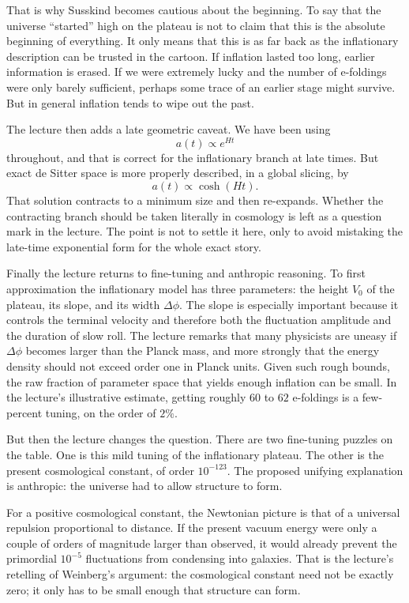 That is why Susskind becomes cautious about the beginning. To say that the universe ``started'' high on the plateau is not to claim that this is the absolute beginning of everything. It only means that this is as far back as the inflationary description can be trusted in the cartoon. If inflation lasted too long, earlier information is erased. If we were extremely lucky and the number of e-foldings were only barely sufficient, perhaps some trace of an earlier stage might survive. But in general inflation tends to wipe out the past.

The lecture then adds a late geometric caveat. We have been using
\begin{equation}
a(t)\propto e^{Ht}
\end{equation}
throughout, and that is correct for the inflationary branch at late times. But exact de Sitter space is more properly described, in a global slicing, by
\begin{equation}
a(t)\propto \cosh(Ht).
\end{equation}
That solution contracts to a minimum size and then re-expands. Whether the contracting branch should be taken literally in cosmology is left as a question mark in the lecture. The point is not to settle it here, only to avoid mistaking the late-time exponential form for the whole exact story.

Finally the lecture returns to fine-tuning and anthropic reasoning. To first approximation the inflationary model has three parameters: the height \(V_0\) of the plateau, its slope, and its width \(\Delta\phi\). The slope is especially important because it controls the terminal velocity and therefore both the fluctuation amplitude and the duration of slow roll. The lecture remarks that many physicists are uneasy if \(\Delta\phi\) becomes larger than the Planck mass, and more strongly that the energy density should not exceed order one in Planck units. Given such rough bounds, the raw fraction of parameter space that yields enough inflation can be small. In the lecture's illustrative estimate, getting roughly \(60\) to \(62\) e-foldings is a few-percent tuning, on the order of \(2\%\).

But then the lecture changes the question. There are two fine-tuning puzzles on the table. One is this mild tuning of the inflationary plateau. The other is the present cosmological constant, of order \(10^{-123}\). The proposed unifying explanation is anthropic: the universe had to allow structure to form.

For a positive cosmological constant, the Newtonian picture is that of a universal repulsion proportional to distance. If the present vacuum energy were only a couple of orders of magnitude larger than observed, it would already prevent the primordial \(10^{-5}\) fluctuations from condensing into galaxies. That is the lecture's retelling of Weinberg's argument: the cosmological constant need not be exactly zero; it only has to be small enough that structure can form.

